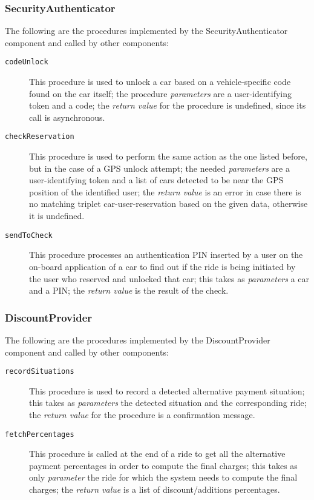 \subsubsection{SecurityAuthenticator}
The following are the procedures implemented by the SecurityAuthenticator component and called by other components:
\begin{description}
\item[\texttt{codeUnlock}] This procedure is used to unlock a car based on a vehicle-specific code found on the car itself; the procedure \textit{parameters} are a user-identifying token and a code; the \textit{return value} for the procedure is undefined, since its call is asynchronous.
\item[\texttt{checkReservation}] This procedure is used to perform the same action as the one listed before, but in the case of a GPS unlock attempt; the needed \textit{parameters} are a user-identifying token and a list of cars detected to be near the GPS position of the identified user; the \textit{return value} is an error in case there is no matching triplet car-user-reservation based on the given data, otherwise it is undefined.
\item[\texttt{sendToCheck}] This procedure processes an authentication PIN inserted by a user on the on-board application of a car to find out if the ride is being initiated by the user who reserved and unlocked that car; this takes as \textit{parameters} a car and a PIN; the \textit{return value} is the result of the check.
\end{description}
\subsubsection{DiscountProvider}
The following are the procedures implemented by the DiscountProvider component and called by other components:
\begin{description}
\item[\texttt{recordSituations}] This procedure is used to record a detected alternative payment situation; this takes as \textit{parameters} the detected situation and the corresponding ride; the \textit{return value} for the procedure is a confirmation message.
\item[\texttt{fetchPercentages}] This procedure is called at the end of a ride to get all the alternative payment percentages in order to compute the final charges; this takes as only \textit{parameter} the ride for which the system needs to compute the final charges; the \textit{return value} is a list of discount/additions percentages.
\end{description}
